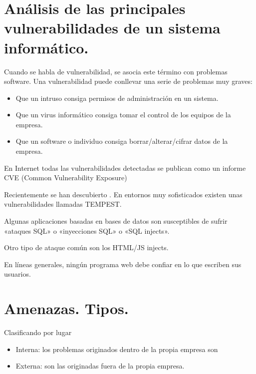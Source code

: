 \documentclass[letterpaper,10pt,spanish]{sphinxmanual}
\begin{document}
\section{Análisis de las principales vulnerabilidades de un sistema informático.}
\label{\detokenize{tema_pautas_seguridad_informatica/tema_pautas_seguridad_informatica:analisis-de-las-principales-vulnerabilidades-de-un-sistema-informatico}}
Cuando se habla de vulnerabilidad, se asocia este término con problemas software. Una vulnerabilidad puede conllevar una serie de problemas muy graves:
\begin{itemize}
\item {} 
Que un intruso consiga permisos de administración en un sistema.

\item {} 
Que un virus informático consiga tomar el control de los equipos de la empresa.

\item {} 
Que un software o individuo consiga borrar/alterar/cifrar datos de la empresa.

\end{itemize}

En Internet todas las vulnerabilidades detectadas se publican como un informe CVE (Common Vulnerability Exposure)

Recientemente se han descubierto .
En entornos muy sofisticados existen unas vulnerabilidades llamadas TEMPEST.

Algunas aplicaciones basadas en bases de datos son susceptibles de sufrir «ataques SQL» o «inyecciones SQL» o «SQL injects».

Otro tipo de ataque común son los HTML/JS injects.

En líneas generales, ningún programa web debe confiar en lo que escriben sus usuarios.


\section{Amenazas. Tipos.}
\label{\detokenize{tema_pautas_seguridad_informatica/tema_pautas_seguridad_informatica:amenazas-tipos}}
Clasificando por lugar
\begin{itemize}
\item {} 
Interna: los problemas originados dentro de la propia empresa son 

\item {} 
Externa: son las originadas fuera de la propia empresa.

\end{itemize}
\end{document}
